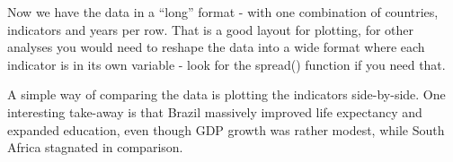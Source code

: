 \documentclass[
]{book}
\newenvironment{Shaded}{\begin{snugshade}}{\end{snugshade}}
\newcommand{\CommentTok}[1]{\textcolor[rgb]{0.56,0.35,0.01}{\textit{#1}}}
\newcommand{\DataTypeTok}[1]{\textcolor[rgb]{0.13,0.29,0.53}{#1}}
\newcommand{\KeywordTok}[1]{\textcolor[rgb]{0.13,0.29,0.53}{\textbf{#1}}}
\newcommand{\NormalTok}[1]{#1}
\newcommand{\OtherTok}[1]{\textcolor[rgb]{0.56,0.35,0.01}{#1}}
\newcommand{\StringTok}[1]{\textcolor[rgb]{0.31,0.60,0.02}{#1}}
\begin{document}
\begin{Shaded}
\end{Shaded}

Now we have the data in a ``long'' format - with one combination of countries, indicators and years per row. That is a good layout for plotting, for other analyses you would need to reshape the data into a wide format where each indicator is in its own variable - look for the spread() function if you need that.

A simple way of comparing the data is plotting the indicators side-by-side. One interesting take-away is that Brazil massively improved life expectancy and expanded education, even though GDP growth was rather modest, while South Africa stagnated in comparison.
\end{document}
